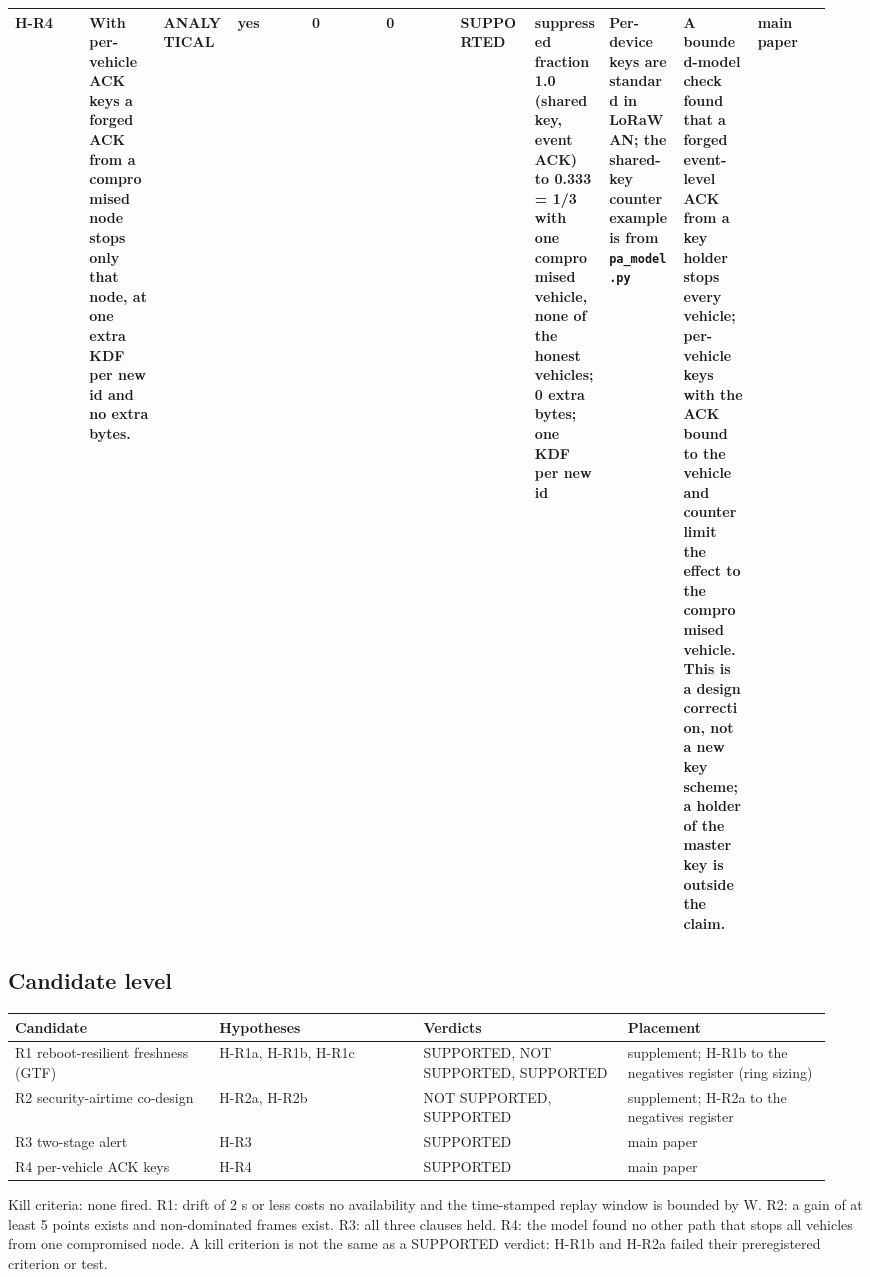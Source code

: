 {\begin{longtable}{p{0.086\linewidth}p{0.086\linewidth}p{0.086\linewidth}p{0.086\linewidth}p{0.086\linewidth}p{0.086\linewidth}p{0.086\linewidth}p{0.086\linewidth}p{0.086\linewidth}p{0.086\linewidth}p{0.086\linewidth}}
H-R4 & With per-vehicle ACK keys a forged ACK from a compromised node stops only that node, at one extra KDF per new id and no extra bytes. & ANALYTICAL & yes & 0 & 0 & \textbf{SUPPORTED} & suppressed fraction 1.0 (shared key, event ACK) to 0.333 = 1/3 with one compromised vehicle, none of the honest vehicles; 0 extra bytes; one KDF per new id & Per-device keys are standard in LoRaWAN; the shared-key counterexample is from \texttt{pa\_model.py} & A bounded-model check found that a forged event-level ACK from a key holder stops every vehicle; per-vehicle keys with the ACK bound to the vehicle and counter limit the effect to the compromised vehicle. This is a design correction, not a new key scheme; a holder of the master key is outside the claim. & main paper \\
\bottomrule
\end{longtable}}

\subsection*{Candidate level}

{\scriptsize\raggedright
\begin{longtable}{p{0.237\linewidth}p{0.237\linewidth}p{0.237\linewidth}p{0.237\linewidth}}
\toprule
Candidate & Hypotheses & Verdicts & Placement \\
\midrule
\endhead
R1 reboot-resilient freshness (GTF) & H-R1a, H-R1b, H-R1c & SUPPORTED, NOT SUPPORTED, SUPPORTED & supplement; H-R1b to the negatives register (ring sizing) \\
R2 security-airtime co-design & H-R2a, H-R2b & NOT SUPPORTED, SUPPORTED & supplement; H-R2a to the negatives register \\
R3 two-stage alert & H-R3 & SUPPORTED & main paper \\
R4 per-vehicle ACK keys & H-R4 & SUPPORTED & main paper \\
\bottomrule
\end{longtable}}

Kill criteria: none fired. R1: drift of 2 s or less costs no availability and the time-stamped replay window is bounded by W. R2: a gain of at least 5 points exists and non-dominated frames exist. R3: all three clauses held. R4: the model found no other path that stops all vehicles from one compromised node. A kill criterion is not the same as a SUPPORTED verdict: H-R1b and H-R2a failed their preregistered criterion or test.

